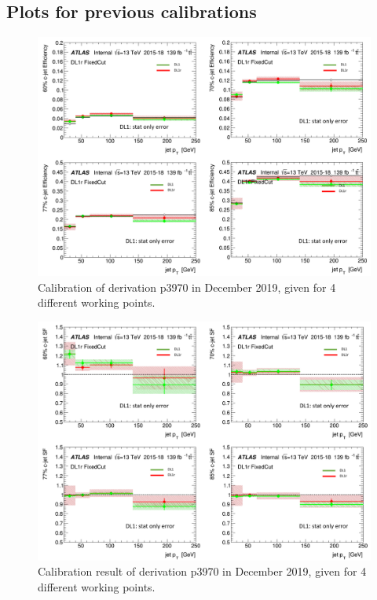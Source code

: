 \documentclass[letterpaper,12pt]{article}
\begin{document}
	

\subsection{Plots for previous calibrations}



\newpage
\begin{figure}[H]
\includegraphics[width=1\textwidth]{Dec_eff.png}
\caption{Calibration of derivation p3970 in December 2019, given for  4 different working points.}\label{fig:Dec_eff}
\end{figure}
\newpage
\begin{figure}[H]
\includegraphics[width=1\textwidth]{Dec.png}
\caption{Calibration result of derivation p3970 in December 2019, given for  4 different working points.}\label{fig:Dec}
\end{figure}
\end{document}
